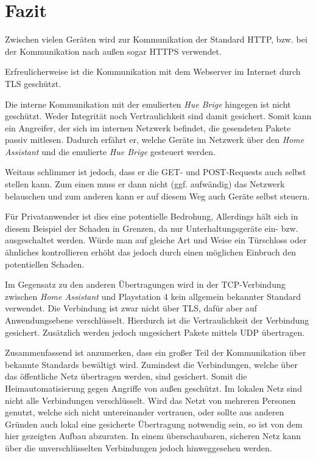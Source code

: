 \newpage

\section{Fazit}\label{sec:fazit}

Zwischen vielen Geräten wird zur Kommunikation der Standard HTTP,
bzw. bei der Kommunikation nach außen sogar HTTPS verwendet.

Erfreulicherweise ist die Kommunikation mit dem Webserver im Internet durch TLS geschützt.

Die interne Kommunikation mit der emulierten \textit{Hue Brige} hingegen ist nicht geschützt.
Weder Integrität noch Vertraulichkeit sind damit gesichert.
Somit kann ein Angreifer, der sich im internen Netzwerk befindet,
die gesendeten Pakete passiv mitlesen.
Dadurch erfährt er,
welche Geräte im Netzwerk über den \textit{Home Assistant} und die emulierte \textit{Hue Brige} gesteuert werden.

Weitaus schlimmer ist jedoch, dass er die GET- und POST-Requests auch selbst stellen kann.
Zum einen muss er dann nicht (ggf. aufwändig) das Netzwerk belauschen
und zum anderen kann er auf diesem Weg auch Geräte selbst steuern.

Für Privatanwender ist dies eine potentielle Bedrohung,
Allerdings hält sich in diesem Beispiel der Schaden in Grenzen, da nur Unterhaltungsgeräte ein- bzw. ausgeschaltet werden.
Würde man auf gleiche Art und Weise ein Türschloss oder ähnliches kontrollieren erhöht das jedoch durch einen
möglichen Einbruch den potentiellen Schaden.

Im Gegensatz zu den anderen Übertragungen wird
in der TCP-Verbindung zwischen \textit{Home Assistant} und Playstation 4 kein allgemein bekannter Standard verwendet.
Die Verbindung ist zwar nicht über TLS, dafür aber auf Anwendungsebene verschlüsselt.
Hierdurch ist die Vertraulichkeit der Verbindung gesichert.
Zusätzlich werden jedoch ungesichert Pakete mittels UDP übertragen.

Zusammenfassend ist anzumerken,
dass ein großer Teil der Kommunikation über bekannte Standards bewältigt wird.
Zumindest die Verbindungen, welche über das öffentliche Netz übertragen werden, sind gesichert.
Somit die Heimautomatisierung gegen Angriffe von außen geschützt.
Im lokalen Netz sind nicht alle Verbindungen verschlüsselt.
Wird das Netzt von mehreren Personen genutzt, welche sich nicht untereinander vertrauen,
oder sollte aus anderen Gründen auch lokal eine gesicherte Übertragung notwendig sein,
so ist von dem hier gezeigten Aufbau abzuraten.
In einem überschaubaren, sicheren Netz kann über die unverschlüsselten Verbindungen jedoch hinweggesehen werden.